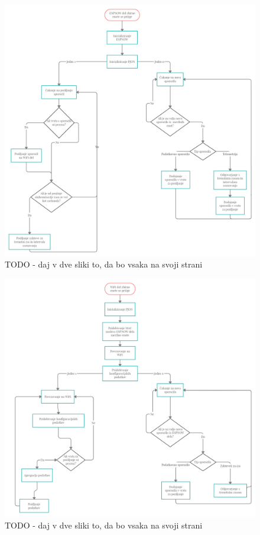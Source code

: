 \documentclass[a4paper, 12pt]{book}
\begin{document}
\begin{figure}[H]
    \centering
    \includegraphics[width=\linewidth]{slikovno_gradivo/Zbirna enota koncept delovanjaESPNOW.png}
    \caption{TODO - daj v dve sliki to, da bo vsaka na svoji strani}
    \label{fig:INMP441}
\end{figure}


\begin{figure}[H]
    \centering
    \includegraphics[width=\linewidth]{slikovno_gradivo/Zbirna enota koncept delovanjaWIFI.png}
    \caption{TODO - daj v dve sliki to, da bo vsaka na svoji strani}
    \label{fig:INMP441}
\end{figure}
\end{document}
